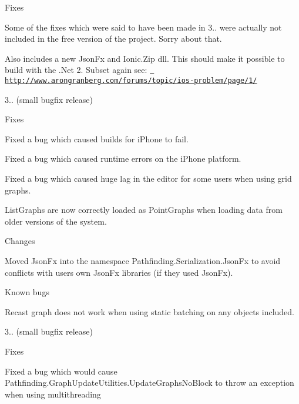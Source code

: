 \begin{DoxyItemize}
\begin{DoxyItemize}
\item Fixes
\begin{DoxyItemize}
\item Some of the fixes which were said to have been made in 3.. were actually not included in the free version of the project. Sorry about that.
\item Also includes a new Json\+Fx and Ionic.\+Zip dll. This should make it possible to build with the .Net 2. Subset again see\+: \href{http://www.arongranberg.com/forums/topic/ios-problem/page/1/}{\texttt{ http\+://www.\+arongranberg.\+com/forums/topic/ios-\/problem/page/1/}}
\end{DoxyItemize}
\end{DoxyItemize}
\item 3.. (small bugfix release)
\begin{DoxyItemize}
\item Fixes
\begin{DoxyItemize}
\item Fixed a bug which caused builds for i\+Phone to fail.
\item Fixed a bug which caused runtime errors on the i\+Phone platform.
\item Fixed a bug which caused huge lag in the editor for some users when using grid graphs.
\item List\+Graphs are now correctly loaded as Point\+Graphs when loading data from older versions of the system.
\end{DoxyItemize}
\item Changes
\begin{DoxyItemize}
\item Moved Json\+Fx into the namespace Pathfinding.\+Serialization.\+Json\+Fx to avoid conflicts with users own Json\+Fx libraries (if they used Json\+Fx).
\end{DoxyItemize}
\item Known bugs
\begin{DoxyItemize}
\item Recast graph does not work when using static batching on any objects included.
\end{DoxyItemize}
\end{DoxyItemize}
\item 3.. (small bugfix release)
\begin{DoxyItemize}
\item Fixes
\begin{DoxyItemize}
\item Fixed a bug which would cause Pathfinding.\+Graph\+Update\+Utilities.\+Update\+Graphs\+No\+Block to throw an exception when using multithreading

\end{DoxyItemize}
\end{DoxyItemize}
\end{DoxyItemize}
